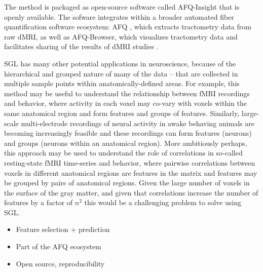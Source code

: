 The method is packaged as open-source software called AFQ-Insight that is openly
available. The sofware integrates within a broader automated fiber
quantification software ecosystem: AFQ \cite{yeatman2012tract}, which extracts
tractometry data from raw dMRI, as well as AFQ-Browser, which visualizes
tractometry data and facilitates sharing of the results of dMRI studies
\cite{yeatman2018browser}.

SGL has many other potential applications in neuroscience, because of the
hierarchical and grouped nature of many of the data -- that are collected in
multiple sample points within anatomically-defined areas. For example, this
method may be useful to understand the relationship between fMRI recordings and
behavior, where activity in each voxel may co-vary with voxels within the same
anatomical region and form features and groups of features. Similarly,
large-scale multi-electrode recordings of neural activity in awake behaving
animals are becoming increasingly feasible \cite{steinmetz2018distributed,
Jun2017-gv} and these recordings can form features (neurons) and groups (neurons
within an anatomical region). More ambitiously perhaps, this approach may be
used to understand the role of correlations in so-called resting-state fMRI
time-series and behavior, where pairwise correlations between voxels in
different anatomical regions are features in the matrix and features may be
grouped by pairs of anatomical regions. Given the large number of voxels in the
surface of the gray matter, and given that correlations increase the number of
features by a factor of $n^2$ this would be a challenging problem to solve using
SGL.

\begin{itemize}
  \item Feature selection + prediction
  \item Part of the AFQ ecosystem
  \item Open source, reproducibility
\end{itemize}
